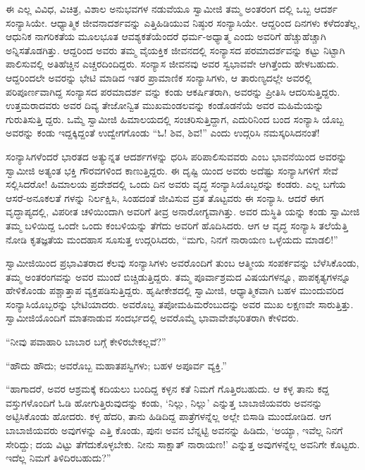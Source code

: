 ಈ ಎಲ್ಲ ವಿವಿಧ, ವಿಚಿತ್ರ, ವಿಶಾಲ ಅನುಭವಗಳ ನಡುವೆಯೂ ಸ್ವಾಮೀಜಿ ತಮ್ಮ ಅಂತರಂಗ ದಲ್ಲಿ ಒಬ್ಬ ಆದರ್ಶ ಸಂನ್ಯಾಸಿಯೇ. ಆಧ್ಯಾತ್ಮಿಕ ಜೀವನಾದರ್ಶವನ್ನು ಎತ್ತಿಹಿಡಿಯುವ ನಿಷ್ಠುರ ಸಂನ್ಯಾಸಿಯೇ. ಆದ್ದರಿಂದ ದಿನಗಳು ಕಳೆದಂತೆಲ್ಲ, ಆಧುನಿಕ ನಾಗರಿಕತೆಯ ಮೂಲಭೂತ ಆವಶ್ಯಕತೆಯೆಂದರೆ ಧರ್ಮ-ಅಧ್ಯಾತ್ಮ ಎಂದು ಅವರಿಗೆ ಹೆಚ್ಚುಹೆಚ್ಚಾಗಿ ಅನ್ನಿಸತೊಡಗಿತ್ತು. ಆದ್ದರಿಂದ ಅವರು ತಮ್ಮ ವೈಯಕ್ತಿಕ ಜೀವನದಲ್ಲಿ ಸಂನ್ಯಾಸದ ಪರಮಾದರ್ಶವನ್ನು ಕಟ್ಟು ನಿಟ್ಟಾಗಿ ಪಾಲಿಸುವಲ್ಲಿ ಅತಿಹೆಚ್ಚಿನ ಎಚ್ಚರದಿಂದಿದ್ದರು. ಸಂನ್ಯಾಸ ಜೀವನವು ಅವರ ಸ್ವಭಾವವೇ ಆಗಿತ್ತೆಂದು ಹೇಳಬಹುದು. ಆದ್ದರಿಂದಲೇ ಅವರನ್ನು ಭೇಟಿ ಮಾಡಿದ ಇತರ ಪ್ರಾಮಾಣಿಕ ಸಂನ್ಯಾಸಿಗಳು, ಆ ತಾರುಣ್ಯದಲ್ಲೇ ಅವರಲ್ಲಿ ಪರಿಪೂರ್ಣವಾಗಿದ್ದ ಸಂನ್ಯಾಸದ ಪರಮಾದರ್ಶ ವನ್ನು ಕಂಡು ಆಕರ್ಷಿತರಾಗಿ, ಅವರನ್ನು ಪ್ರೀತಿಸಿ ಆದರಿಸುತ್ತಿದ್ದರು. ಉತ್ತಮರಾದವರು ಅವರ ದಿವ್ಯ ತೇಜೋನ್ವಿತ ಮುಖಮಂಡಲವನ್ನು ಕಂಡೊಡನೆಯೆ ಅವರ ಮಹಿಮೆಯನ್ನು ಗುರುತಿಸುತ್ತಿ ದ್ದರು. ಒಮ್ಮೆ ಸ್ವಾಮೀಜಿ ಹಿಮಾಲಯದಲ್ಲಿ ಸಂಚರಿಸುತ್ತಿದ್ದಾಗ, ಎದುರಿನಿಂದ ಬಂದ ಸಂನ್ಯಾಸಿ ಯೊಬ್ಬ ಅವರನ್ನು ಕಂಡು ಇದ್ದಕ್ಕಿದ್ದಂತೆ ಉದ್ವೇಗಗೊಂಡು “ಓ! ಶಿವ, ಶಿವ!” ಎಂದು ಉದ್ಗರಿಸಿ ನಮಸ್ಕರಿಸಿದನಂತೆ!

ಸಂನ್ಯಾಸಿಗಳೆಂದರೆ ಭಾರತದ ಅತ್ಯುನ್ನತ ಆದರ್ಶಗಳನ್ನು ಧರಿಸಿ ಪರಿಪಾಲಿಸುವವರು ಎಂಬ ಭಾವನೆಯಿಂದ ಅವರನ್ನು ಸ್ವಾಮೀಜಿ ಅತ್ಯಂತ ಭಕ್ತಿ ಗೌರವಗಳಿಂದ ಕಾಣುತ್ತಿದ್ದರು. ಈ ದೃಷ್ಟಿ ಯಿಂದ ಅವರು ಅದೆಷ್ಟು ಸಂನ್ಯಾಸಿಗಳಿಗೆ ಸೇವೆ ಸಲ್ಲಿಸಿದರೋ! ಹಿಮಾಲಯ ಪ್ರದೇಶದಲ್ಲಿ ಒಂದು ದಿನ ಅವರು ವೃದ್ಧ ಸಂನ್ಯಾಸಿಯೊಬ್ಬರನ್ನು ಕಂಡರು. ಎಲ್ಲ ಬಗೆಯ ಆಸರೆ-ಅನೂಕಲತೆ ಗಳನ್ನು ನಿರ್ಲಕ್ಷಿಸಿ, ಸಿಂಹದಂತೆ ಜೀವಿಸುವ ವ್ರತ ತೊಟ್ಟವರು ಈ ಸಂನ್ಯಾಸಿ. ಆದರೆ ಈಗ ವೃದ್ಧಾಪ್ಯದಲ್ಲಿ, ವಿಪರೀತ ಚಳಿಯಿಂದಾಗಿ ಅವರಿಗೆ ತೀವ್ರ ಅನಾರೋಗ್ಯವಾಗಿತ್ತು. ಅವರ ದುಸ್ಥಿತಿ ಯನ್ನು ಕಂಡು ಸ್ವಾಮೀಜಿ ತಮ್ಮ ಬಳಿಯಿದ್ದ ಒಂದೇ ಒಂದು ಕಂಬಳಿಯನ್ನು ತೆಗೆದು ಅವರಿಗೆ ಹೊದಿಸಿದರು. ಆಗ ಆ ವೃದ್ಧ ಸಂನ್ಯಾಸಿ ತಲೆಯೆತ್ತಿ ನೋಡಿ ಕೃತಜ್ಞತೆಯ ಮಂದಹಾಸ ಸೂಸುತ್ತ ಉದ್ಗರಿಸಿದರು, “ಮಗು, ನಿನಗೆ ನಾರಾಯಣ ಒಳ್ಳೆಯದು ಮಾಡಲಿ!”

ಸ್ವಾಮೀಜಿಯಿಂದ ಪ್ರಭಾವಿತರಾದ ಕೆಲವು ಸಂನ್ಯಾಸಿಗಳು ಅವರೊಂದಿಗೆ ತುಂಬ ಆತ್ಮೀಯ ಸಂಪರ್ಕವನ್ನು ಬೆಳೆಸಿಕೊಂಡು, ತಮ್ಮ ಅಂತರಂಗವನ್ನು ಅವರ ಮುಂದೆ ಬಿಚ್ಚಿಡುತ್ತಿದ್ದರು. ತಮ್ಮ ಪೂರ್ವಾಶ್ರಮದ ವಿಷಯಗಳನ್ನೂ, ಪಾಪಕೃತ್ಯಗಳನ್ನೂ ಹೇಳಿಕೊಂಡು ಪಶ್ಚಾತ್ತಾಪ ವ್ಯಕ್ತಪಡಿಸುತ್ತಿದ್ದರು. ಹೃಷೀಕೇಶದಲ್ಲಿ ಸ್ವಾಮೀಜಿ, ಆಧ್ಯಾತ್ಮಿಕವಾಗಿ ಬಹಳ ಮುಂದುವರಿದ ಸಂನ್ಯಾಸಿಯೊಬ್ಬರನ್ನು ಭೇಟಿಯಾದರು. ಅವರೊಬ್ಬ ತಪೋಮಹಿಮರೆಂಬುದನ್ನು ಅವರ ಮುಖ ಲಕ್ಷಣವೇ ಸಾರುತ್ತಿತ್ತು. ಸ್ವಾಮೀಜಿಯೊಂದಿಗೆ ಮಾತನಾಡುವ ಸಂದರ್ಭದಲ್ಲಿ ಅವರೊಮ್ಮೆ ಭಾವಾವೇಶಭರಿತರಾಗಿ ಕೇಳಿದರು.

“ನೀವು ಪವಾಹಾರಿ ಬಾಬಾರ ಬಗ್ಗೆ ಕೇಳಿರಬೇಕಲ್ಲವೆ?”

“ಹೌದು ಹೌದು; ಅವರೊಬ್ಬ ಮಹಾತಪಸ್ವಿಗಳು; ಬಹಳ ಅಪೂರ್ವ ವ್ಯಕ್ತಿ.”

“ಹಾಗಾದರೆ, ಅವರ ಆಶ್ರಮಕ್ಕೆ ಕದಿಯಲು ಬಂದಿದ್ದ ಕಳ್ಳನ ಕತೆ ನಿಮಗೆ ಗೊತ್ತಿರಬಹುದು. ಆ ಕಳ್ಳ ತಾನು ಕದ್ದ ವಸ್ತುಗಳೊಂದಿಗೆ ಓಡಿ ಹೋಗುತ್ತಿರುವುದನ್ನು ಕಂಡು, ‘ನಿಲ್ಲು, ನಿಲ್ಲು’ ಎನ್ನುತ್ತ ಬಾಬಾಜಿಯವರು ಅವನನ್ನು ಅಟ್ಟಿಸಿಕೊಂಡು ಹೋದರು. ಕಳ್ಳ ಹೆದರಿ, ತಾನು ಹಿಡಿದಿದ್ದ ಪಾತ್ರೆಗಳನ್ನೆಲ್ಲ ಅಲ್ಲೇ ಬಿಸಾಡಿ ಮುಂದೋಡಿದ. ಆಗ ಬಾಬಾಜಿಯವರು ಅವುಗಳನ್ನು ಎತ್ತಿ ಕೊಂಡು, ಪುನಃ ಅವನ ಬೆನ್ನಟ್ಟಿ ಅವನನ್ನು ಹಿಡಿದು, ‘ಅಯ್ಯಾ, ಇವೆಲ್ಲ ನಿನಗೆ ಸೇರಿದ್ದು; ದಯ ವಿಟ್ಟು ತೆಗೆದುಕೊಳ್ಳಬೇಕು. ನೀನು ಸಾಕ್ಷಾತ್ ನಾರಾಯಣ!’ ಎನ್ನುತ್ತ ಅವುಗಳನ್ನೆಲ್ಲ ಅವನಿಗೇ ಕೊಟ್ಟರು. ಇದೆಲ್ಲ ನಿಮಗೆ ತಿಳಿದಿರಬಹುದು?”

